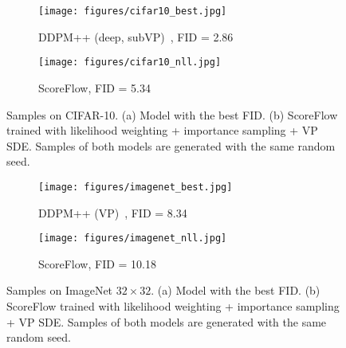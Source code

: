 \begin{figure}
     \centering
     \begin{subfigure}{\textwidth}
         \centering
         \texttt{[image: figures/cifar10\_best.jpg]}
         \caption{DDPM++ (deep, subVP)~\protect\cite{song2020score}, FID = 2.86}
     \end{subfigure}
     \begin{subfigure}{\textwidth}
         \centering
         \texttt{[image: figures/cifar10\_nll.jpg]}
         \caption{ScoreFlow, FID = 5.34}
     \end{subfigure}
     \caption{Samples on CIFAR-10. (a) Model with the best FID. (b) ScoreFlow trained with likelihood weighting + importance sampling + VP SDE. Samples of both models are generated with the same random seed.}\label{fig:cifar}
\end{figure}

\begin{figure}
     \centering
     \begin{subfigure}{\textwidth}
         \centering
         \texttt{[image: figures/imagenet\_best.jpg]}
         \caption{DDPM++ (VP)~\protect\cite{song2020score}, FID = 8.34}
     \end{subfigure}
     \begin{subfigure}{\textwidth}
         \centering
         \texttt{[image: figures/imagenet\_nll.jpg]}
         \caption{ScoreFlow, FID = 10.18}
     \end{subfigure}
     \caption{Samples on ImageNet $32\times 32$. (a) Model with the best FID. (b) ScoreFlow trained with likelihood weighting + importance sampling + VP SDE. Samples of both models are generated with the same random seed.}\label{fig:imagenet}
\end{figure}







